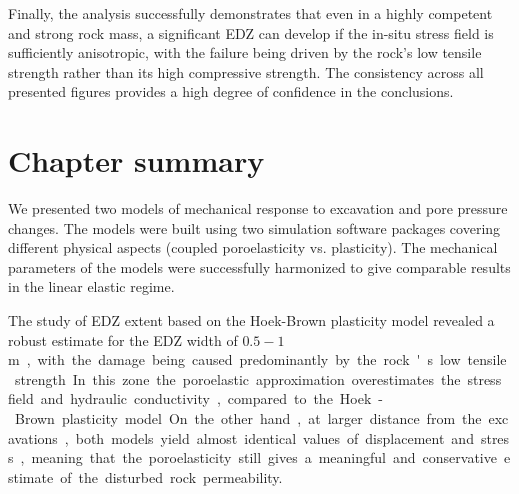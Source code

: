 Finally, the analysis successfully demonstrates that even in a highly competent and strong rock mass, a significant \gls{EDZ} can develop if the in-situ stress field is sufficiently anisotropic, with the failure being driven by the rock's low tensile strength rather than its high compressive strength. The consistency across all presented figures provides a high degree of confidence in the conclusions.




\section{Chapter summary}

We presented two models of mechanical response to excavation and pore pressure changes.
The models were built using two simulation software packages covering different physical aspects (coupled poroelasticity vs. plasticity).
The mechanical parameters of the models were successfully harmonized to give comparable results in the linear elastic regime.

The study of \Gls{EDZ} extent based on the Hoek-Brown plasticity model revealed a robust estimate for the \Gls{EDZ} width of $0.5-1$ \unit\meter, with the damage being caused predominantly by the rock's low tensile strength.
In this zone the poroelastic approximation overestimates the stress field and hydraulic conductivity, compared to the Hoek-Brown plasticity model. On the other hand, at larger distance from the excavations, both models yield almost identical values of displacement and stress, meaning that the poroelasticity still gives a meaningful and conservative estimate of the disturbed rock permeability.

